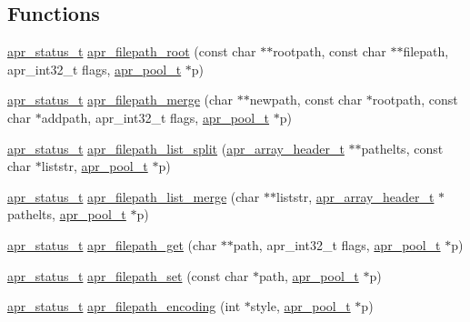 \subsection*{Functions}
\begin{DoxyCompactItemize}
\item 
\hyperlink{group__apr__errno_gaf76ee4543247e9fb3f3546203e590a6c}{apr\-\_\-status\-\_\-t} \hyperlink{group__apr__filepath_ga1eacdd5ed069faa137bde014fa50494d}{apr\-\_\-filepath\-\_\-root} (const char $\ast$$\ast$rootpath, const char $\ast$$\ast$filepath, apr\-\_\-int32\-\_\-t flags, \hyperlink{group__apr__pools_gaf137f28edcf9a086cd6bc36c20d7cdfb}{apr\-\_\-pool\-\_\-t} $\ast$p)
\item 
\hyperlink{group__apr__errno_gaf76ee4543247e9fb3f3546203e590a6c}{apr\-\_\-status\-\_\-t} \hyperlink{group__apr__filepath_gae89fd67108f10dc5044b6d062dde0138}{apr\-\_\-filepath\-\_\-merge} (char $\ast$$\ast$newpath, const char $\ast$rootpath, const char $\ast$addpath, apr\-\_\-int32\-\_\-t flags, \hyperlink{group__apr__pools_gaf137f28edcf9a086cd6bc36c20d7cdfb}{apr\-\_\-pool\-\_\-t} $\ast$p)
\item 
\hyperlink{group__apr__errno_gaf76ee4543247e9fb3f3546203e590a6c}{apr\-\_\-status\-\_\-t} \hyperlink{group__apr__filepath_gaf259849de62ac172dde7dcbe73421500}{apr\-\_\-filepath\-\_\-list\-\_\-split} (\hyperlink{structapr__array__header__t}{apr\-\_\-array\-\_\-header\-\_\-t} $\ast$$\ast$pathelts, const char $\ast$liststr, \hyperlink{group__apr__pools_gaf137f28edcf9a086cd6bc36c20d7cdfb}{apr\-\_\-pool\-\_\-t} $\ast$p)
\item 
\hyperlink{group__apr__errno_gaf76ee4543247e9fb3f3546203e590a6c}{apr\-\_\-status\-\_\-t} \hyperlink{group__apr__filepath_ga8316896ab8e3901f9711d9d4cc89b373}{apr\-\_\-filepath\-\_\-list\-\_\-merge} (char $\ast$$\ast$liststr, \hyperlink{structapr__array__header__t}{apr\-\_\-array\-\_\-header\-\_\-t} $\ast$pathelts, \hyperlink{group__apr__pools_gaf137f28edcf9a086cd6bc36c20d7cdfb}{apr\-\_\-pool\-\_\-t} $\ast$p)
\item 
\hyperlink{group__apr__errno_gaf76ee4543247e9fb3f3546203e590a6c}{apr\-\_\-status\-\_\-t} \hyperlink{group__apr__filepath_gaac7c26321fd60d7304326fe531639507}{apr\-\_\-filepath\-\_\-get} (char $\ast$$\ast$path, apr\-\_\-int32\-\_\-t flags, \hyperlink{group__apr__pools_gaf137f28edcf9a086cd6bc36c20d7cdfb}{apr\-\_\-pool\-\_\-t} $\ast$p)
\item 
\hyperlink{group__apr__errno_gaf76ee4543247e9fb3f3546203e590a6c}{apr\-\_\-status\-\_\-t} \hyperlink{group__apr__filepath_ga9773589b65b7f0b7d5b59d427fd0eb93}{apr\-\_\-filepath\-\_\-set} (const char $\ast$path, \hyperlink{group__apr__pools_gaf137f28edcf9a086cd6bc36c20d7cdfb}{apr\-\_\-pool\-\_\-t} $\ast$p)
\item 
\hyperlink{group__apr__errno_gaf76ee4543247e9fb3f3546203e590a6c}{apr\-\_\-status\-\_\-t} \hyperlink{group__apr__filepath_gad4d3a5888a54a52b3552911e448a3eb3}{apr\-\_\-filepath\-\_\-encoding} (int $\ast$style, \hyperlink{group__apr__pools_gaf137f28edcf9a086cd6bc36c20d7cdfb}{apr\-\_\-pool\-\_\-t} $\ast$p)
\end{DoxyCompactItemize}


